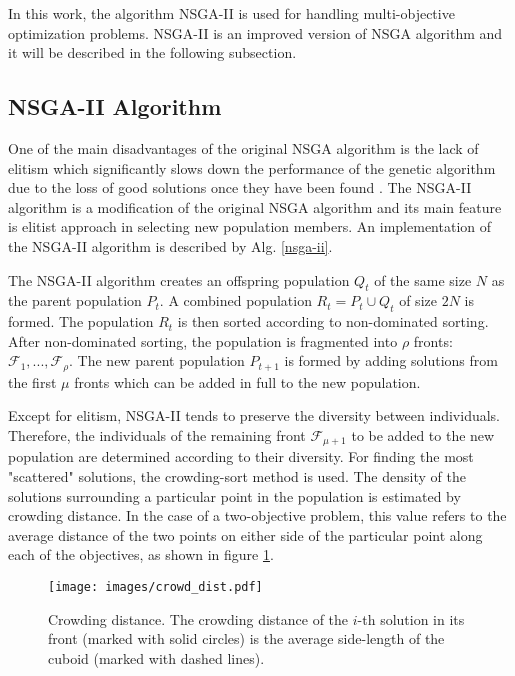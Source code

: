 In this work, the algorithm NSGA-II is used for handling multi-objective optimization problems. 
NSGA-II is an improved version of NSGA algorithm and it will be described in the following subsection. 

\subsection{NSGA-II Algorithm}
One of the main disadvantages of the original NSGA algorithm is the lack of elitism which significantly slows down the performance of the genetic algorithm due to the loss of good solutions once they have been found \cite{deb2000fast}. 
The NSGA-II algorithm is a modification of the original NSGA algorithm and its main feature is elitist approach in selecting new population members. 
An implementation of the NSGA-II algorithm is described by Alg. \ref{nsga-ii}.

The NSGA-II algorithm creates an offspring population $Q_t$ of the same size $N$ as the parent population $P_t$.
A combined population $R_t = P_t \cup Q_t$ of size $2N$ is formed.
The population $R_t$ is then sorted according to non-dominated sorting. 
After non-dominated sorting, the population is fragmented into $\rho$ fronts: $\mathcal{F}_1, ..., \mathcal{F}_\rho$.
The new parent population $P_{t+1}$ is formed by adding solutions from the first $\mu$ fronts which can be added in full to the new population. 

Except for elitism, NSGA-II tends to preserve the diversity between individuals. 
Therefore, the individuals of the remaining front $\mathcal{F}_{\mu+1}$ to be added to the new population are determined according to their diversity. 
For finding the most "scattered" solutions, the crowding-sort method is used. 
The density of the solutions surrounding a particular point in the population is estimated by crowding distance. 
In the case of a two-objective problem, this value refers to the average distance of the two points on either side of the particular point along each of the objectives, as shown in figure 
\ref{crowding_dist}. 

\begin{figure}[ht]
    \centering
    \texttt{[image: images/crowd\_dist.pdf]}
    \caption{Crowding distance. The crowding distance of the $i$-th solution in its front (marked with solid circles) is the average side-length of the cuboid (marked with dashed lines). }
    \label{crowding_dist}
\end{figure}

